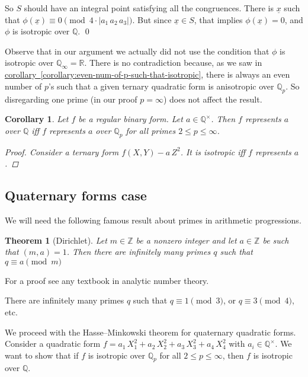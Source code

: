 \documentclass{article}
\newcommand{\ZZ}{\mathbb{Z}}
\newcommand{\QQ}{\mathbb{Q}}
\newcommand{\refref}[2]{\hyperref[#2]{#1~\ref*{#2}}}
\newcommand{\examplesymbol}{$\blacktriangle$}
\renewcommand{\qedsymbol}{$\blacksquare$}
\theoremstyle{myplain}
\newtheorem{theorem}[proposition]{Theorem}
\newtheorem{corollary}[proposition]{Corollary}
\theoremstyle{mydefinition}
\newenvironment{example}
  {\pushQED{\qed}\renewcommand{\qedsymbol}{\examplesymbol}\examplex}
  {\popQED\endexamplex}
\begin{document}
So $S$ should have an integral point satisfying all the congruences. There is
$\underline{x}$ such that
$\phi (\underline{x}) \equiv 0 \pmod{4\cdot |a_1\,a_2\,a_3|}$. But since
$\underline{x} \in S$, that implies $\phi (\underline{x}) = 0$, and $\phi$ is
isotropic over $\QQ$. \qed

\vspace{1em}

Observe that in our argument we actually did not use the condition that $\phi$
is isotropic over $\QQ_\infty = \mathbb{R}$. There is no contradiction because,
as we saw in \refref{corollary}{corollary:even-num-of-p-such-that-isotropic},
there is always an even number of $p$'s such that a given ternary quadratic form
is anisotropic over $\QQ_p$. So disregarding one prime (in our proof
$p = \infty$) does not affect the result.

\begin{corollary}
  Let $f$ be a regular binary form. Let $a \in \QQ^\times$. Then $f$ represents
  $a$ over $\QQ$ iff $f$ represents $a$ over $\QQ_p$ for all primes
  $2 \le p \le \infty$.

  \begin{proof}
    Consider a ternary form $f (X,Y) - a\,Z^2$. It is isotropic iff $f$
    represents $a$.
  \end{proof}
\end{corollary}

\subsection*{Quaternary forms case}

We will need the following famous result about primes in arithmetic
progressions.

\begin{theorem}[Dirichlet]
  Let $m \in \ZZ$ be a nonzero integer and let $a \in \ZZ$ be such that
  $(m,a) = 1$. Then there are infinitely many primes $q$ such that
  $q \equiv a \pmod{m}$
\end{theorem}

For a proof see any textbook in analytic number theory.

\begin{example}
  There are infinitely many primes $q$ such that $q \equiv 1 \pmod{3}$,
  or $q \equiv 3 \pmod{4}$, etc.
\end{example}

\vspace{1em}

We proceed with the Hasse--Minkowski theorem for quaternary quadratic
forms. Consider a quadratic form
$f = a_1\,X_1^2 + a_2\,X_2^2 + a_3\,X_3^2 + a_4\,X_4^2$ with
$a_i \in \QQ^\times$. We want to show that if $f$ is isotropic over $\QQ_p$ for
all $2 \le p \le \infty$, then $f$ is isotropic over $\QQ$.
\end{document}
